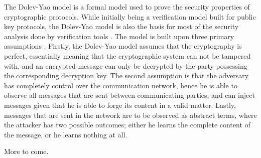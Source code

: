 The Dolev-Yao model is a formal model used to prove the security properties of cryptographic protocols. While initially being a verification model built for public key protocols, the Dolev-Yao model is also the basis for most of the security analysis done by verification tools \cite{cremers2005operational}. The model is built upon three primary assumptions \cite{dolev1983security}. Firstly, the Dolev-Yao model assumes that the cryptography is perfect, essentially meaning that the cryptographic system can not be tampered with, and an encrypted message can only be decrypted by the party possessing the corresponding decryption key. The second assumption is that the adversary has completely control over the communication network, hence he is able to observe all messages that are sent between communicating parties, and can inject messages given that he is able to forge its content in a valid matter. Lastly, messages that are sent in the network are to be observed as abstract terms, where the attacker has two possible outcomes; either he learns the complete content of the message, or he learns nothing at all. 

More to come.


